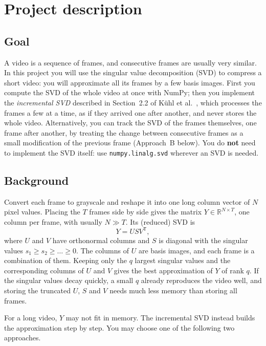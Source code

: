 \documentclass[11pt,a4paper]{article}
\begin{document}
\section*{Project description}

\subsection*{Goal}
A video is a sequence of frames, and consecutive frames are usually very
similar. In this project you will use the singular value decomposition (SVD)
to compress a short video: you will approximate all its frames by a few
basis images. First you compute the SVD of the whole video at once with
NumPy; then you implement the \emph{incremental SVD} described in
Section~2.2 of Kühl et al.\ \cite{kuehl}, which processes the frames a few at
a time, as if they arrived one after another, and never stores the whole
video. Alternatively, you can track the SVD of the frames themselves, one
frame after another, by treating the change between consecutive frames as a
small modification of the previous frame (Approach~B below). You do
\textbf{not} need to implement the SVD itself: use
\texttt{numpy.linalg.svd} \cite{numpy} wherever an SVD is needed.

\subsection*{Background}
Convert each frame to grayscale and reshape it into one long column vector
of $N$ pixel values. Placing the $T$ frames side by side gives the matrix
$Y \in \mathbb{R}^{N \times T}$, one column per frame, with usually
$N \gg T$. Its (reduced) SVD is
\begin{equation*}
  Y = U S V^{\mathsf{T}},
\end{equation*}
where $U$ and $V$ have orthonormal columns and $S$ is diagonal with the
singular values $s_1 \ge s_2 \ge \dots \ge 0$. The columns of $U$ are basis
images, and each frame is a combination of them. Keeping only the $q$ largest
singular values and the corresponding columns of $U$ and $V$ gives the best
approximation of $Y$ of rank $q$. If the singular values decay quickly, a
small $q$ already reproduces the video well, and storing the truncated $U$,
$S$ and $V$ needs much less memory than storing all frames.

For a long video, $Y$ may not fit in memory. The incremental SVD
\cite{kuehl,brand2002,brand2006} instead builds the approximation step by
step. You may choose one of the following two approaches.
\end{document}
